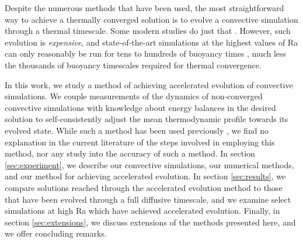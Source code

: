 \documentclass[aps, pre, onecolumn, nofootinbib, notitlepage, groupedaddress, amsfonts, amssymb, amsmath, longbibliography]{revtex4-1}
\begin{document}
Despite the numerous methods that have been used,
the most straightforward way to achieve a thermally converged solution
is to evolve a convective simulation through a thermal timescale. Some modern
studies do just that \cite{featherstone&hindman2016}.
However, such evolution is
\emph{expensive}, and state-of-the-art simulations at the highest values of Ra
can only reasonably be run
for tens to hundreds of buoyancy times \cite{stevens&all2011}, much less the
thousands of buoyancy timescales required for thermal convergence.

In this work, we study a method of achieving accelerated evolution of
convective simulations. We couple measurements of the dynamics of non-converged
convective simulations with knowledge about energy balances in the desired solution
to self-consistently adjust the mean thermodynamic profile towards its evolved state. 
While such a method has been used previously \cite{hurlburt&all1986}, 
we find no explanation in the current literature of the steps involved in employing
this method, nor any study into the accuracy of such a method.
In section \ref{sec:experiment}, we describe our convective simulations, our
numerical methods, and our method for achieving accelerated evolution. In
section \ref{sec:results}, we compare solutions reached through the accelerated evolution
method to those that have been evolved through a full diffusive timescale, and we
examine select simulations at high Ra which have achieved accelerated evolution. Finally,
in section \ref{sec:extensions}, we discuss extensions of the methods presented here,
and we offer concluding remarks.


\end{document}
